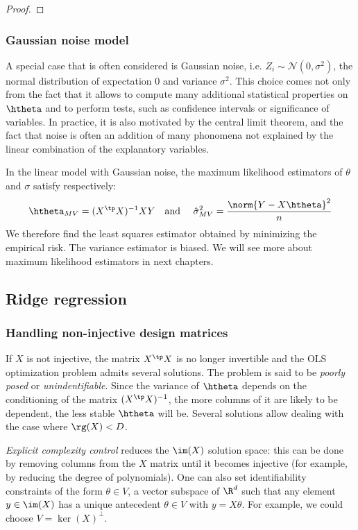 \documentclass{../cs-classes/cs-classes}
\begin{document}
\begin{proof}
\end{proof}

\subsubsection{Gaussian noise model}
A special case that is often considered is Gaussian noise, i.e. $Z_i\sim\mathcal{N}(0, \sigma^2)$, the normal distribution of expectation 0 and variance $\sigma^2$. This choice comes not only from the fact that it allows to compute many additional statistical properties on $\htheta$ and to perform tests, such as confidence intervals or significance of variables. In practice, it is also motivated by the central limit theorem, and the fact that noise is often an addition of many phonomena not explained by the linear combination of the explanatory variables.

\begin{property}
    In the linear model with Gaussian noise, the maximum likelihood estimators of $\theta$ and $\sigma$ satisfy respectively:
    \begin{equation*}
        \htheta_{MV}=(X^\tp X)^{-1}XY \quad \textnormal{and} \quad \hat{\sigma}^2_{MV}=\frac{\norm{Y-X\htheta}^2}{n}
    \end{equation*}
    We therefore find the least squares estimator obtained by minimizing the empirical risk. The variance estimator is biased. We will see more about maximum likelihood estimators in next chapters.
\end{property}

\subsection{Ridge regression}
\subsubsection{Handling non-injective design matrices}
If $X$ is not injective, the matrix $X^\tp X$ is no longer invertible and the OLS optimization problem admits several solutions. The problem is said to be \emph{poorly posed} or \emph{unindentifiable}. Since the variance of $\htheta$ depends on the conditioning of the matrix $(X^\tp X)^{-1}$, the more columns of it are likely to be dependent, the less stable $\htheta$ will be. Several solutions allow dealing with the case where $\rg(X)<D$.

\emph{Explicit complexity control} reduces the $\im(X)$ solution space: this can be done by removing columns from the $X$ matrix until it becomes injective (for example, by reducing the degree of polynomials). One can also set identifiability constraints of the form $\theta\in V$, a vector subspace of $\R^d$ such that any element $y\in\im(X)$ has a unique antecedent $\theta\in V$ with $y=X\theta$. For example, we could choose $V=\ker(X)^\bot$.
\end{document}
